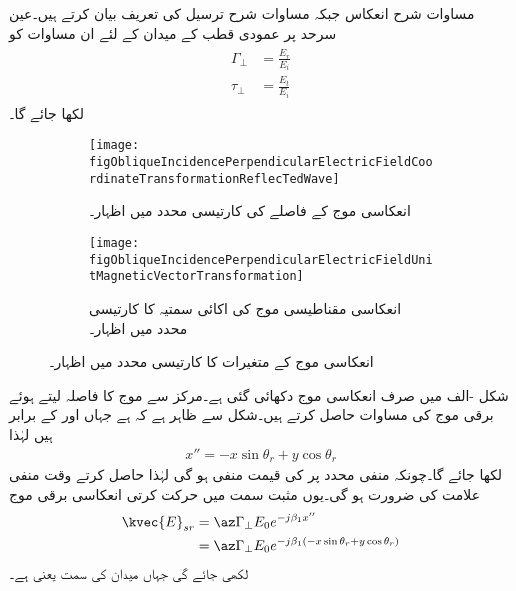 مساوات  شرح انعکاس جبکہ مساوات  شرح ترسیل کی تعریف بیان کرتے ہیں۔عین سرحد پر عمودی  قطب کے میدان کے لئے ان مساوات کو
\begin{gather}
\begin{aligned}\label{مساوات_ترچھی_سرحدی_شرائط}
\Gamma_{\perp}&=\frac{E_r}{E_i} \\
\tau_{\perp} &=\frac{E_t}{E_i}
\end{aligned}
\end{gather}
لکھا جائے گا۔
\begin{figure}
\centering
\begin{subfigure}{0.4\textwidth}
\centering
\texttt{[image: figObliqueIncidencePerpendicularElectricFieldCoordinateTransformationReflecTedWave]}
\caption{انعکاسی موج کے فاصلے کی کارتیسی محدد میں اظہار۔}
\label{شکل_ترچھی_انعکاسی_برقی}
\end{subfigure}%
\begin{subfigure}{0.4\textwidth}
\centering
\texttt{[image: figObliqueIncidencePerpendicularElectricFieldUnitMagneticVectorTransformation]}
\caption{انعکاسی مقناطیسی موج کی اکائی سمتیہ کا کارتیسی محدد میں اظہار۔}
\label{شکل_ترچھی_انعکاسی_مقناطیسی_اکائی}
\end{subfigure}%
\caption{انعکاسی موج کے متغیرات کا کارتیسی محدد میں اظہار۔}
\label{شکل_ترچھی_اکائی_اظہار}
\end{figure}

شکل -الف میں صرف انعکاسی  موج دکھائی گئی ہے۔مرکز  سے موج کا فاصلہ  لیتے ہوئے برقی موج کی مساوات حاصل کرتے ہیں۔شکل سے ظاہر ہے کہ  ہے جہاں  اور  کے برابر ہیں لہٰذا
\begin{align}
x''=-x \sin \theta_r+y\cos \theta_r
\end{align}
لکھا جائے گا۔چونکہ منفی محدد پر  کی قیمت منفی ہو گی لہٰذا  حاصل کرتے وقت منفی علامت کی ضرورت ہو گی۔یوں مثبت  سمت میں حرکت کرتی  انعکاسی برقی موج
\begin{gather}
\begin{aligned} \label{مساوات_ترچھی_انعکاسی_برقی_میدان_دوری_سمتی}
\kvec{E}_{sr}&=\az \Gamma_{\perp} E_0 e^{- j \beta_1 x''}\\
&=\az \Gamma_{\perp} E_0 e^{- j \beta_1 (-x \sin \theta_r+y\cos \theta_r)}
\end{aligned}
\end{gather}
لکھی جائے گی جہاں میدان کی سمت  یعنی  ہے۔

